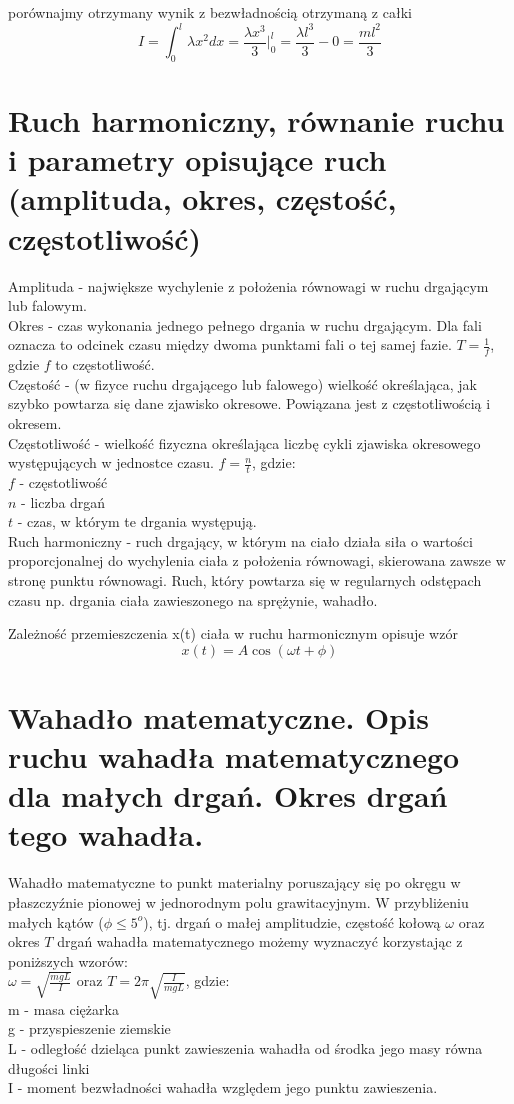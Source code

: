 \documentclass[a4paper,11pt]{article} %
\begin{document}
porównajmy otrzymany wynik z bezwładnością otrzymaną z całki 
$$ I = \int_{0}^{l} \lambda x^2 dx = \frac{\lambda x^3}{3}|_{0}^{l} = \frac{\lambda l^3}{3} - 0 = \frac{ml^2}{3}$$

\section{ Ruch harmoniczny, równanie ruchu i parametry opisujące ruch (amplituda,
okres, częstość, częstotliwość)}
Amplituda - największe wychylenie z położenia równowagi w ruchu drgającym lub falowym. \\
Okres - czas wykonania jednego pełnego drgania w ruchu drgającym. Dla fali oznacza to odcinek czasu między dwoma punktami fali o tej samej fazie. $ T = \frac{1}{f}$, gdzie $f$ to częstotliwość.\\
Częstość - (w fizyce ruchu drgającego lub falowego) wielkość określająca, jak szybko powtarza się dane zjawisko okresowe. Powiązana jest z częstotliwością i okresem.\\
Częstotliwość - wielkość fizyczna określająca liczbę cykli zjawiska okresowego występujących w jednostce czasu. $f = \frac{n}{t}$, gdzie: \\
$f$ - częstotliwość\\
$n$ - liczba drgań\\
$t$ - czas, w którym te drgania występują.\\

Ruch harmoniczny - ruch drgający, w którym na ciało działa siła o wartości proporcjonalnej do wychylenia ciała z położenia równowagi, skierowana zawsze w stronę punktu równowagi. Ruch, który powtarza się w regularnych odstępach czasu np. drgania ciała zawieszonego na sprężynie, wahadło.

Zależność przemieszczenia x(t) ciała w ruchu harmonicznym opisuje wzór
$$x(t) = A \cos (\omega t + \phi)$$

\section{Wahadło matematyczne. Opis ruchu wahadła matematycznego dla małych
drgań. Okres drgań tego wahadła.{\color{red}{Gotowe}}}

Wahadło matematyczne to punkt materialny poruszający się po okręgu w płaszczyźnie pionowej w jednorodnym polu grawitacyjnym.
W przybliżeniu małych kątów ($\phi \le 5^o$), tj. drgań o małej amplitudzie, częstość kołową $\omega$ oraz okres $T$ drgań wahadła matematycznego możemy wyznaczyć korzystając z poniższych wzorów:\\
$ \omega = \sqrt{\frac{mgL}{I}} $ oraz $ T = 2 \pi \sqrt{\frac{I}{mgL}}$, gdzie:\\
m - masa ciężarka\\
g - przyspieszenie ziemskie\\
L - odległość dzieląca punkt zawieszenia wahadła od środka jego masy równa długości linki\\
I - moment bezwładności wahadła względem jego punktu zawieszenia.
\end{document}
